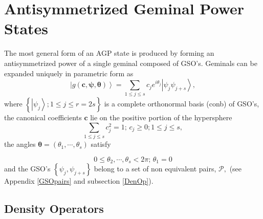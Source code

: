 \documentclass[aps,preprint]{revtex4}%
\begin{document}
\section{Antisymmetrized Geminal Power States\label{AGP States}}

The most general form of an AGP state is produced by forming an
antisymmetrized power of a single geminal composed of GSO's. Geminals can be
expanded uniquely in parametric form as
\begin{equation}
\left\vert g\left(  \boldsymbol{c},\boldsymbol{\psi},\boldsymbol{\theta
}\right)  \right\rangle =\sum_{1\leq j\leq s}c_{j}e^{i\theta_{j}}\left\vert
\psi_{j}\psi_{j+s}\right\rangle , \label{gem}%
\end{equation}
where $\left\{  \left\vert \psi_{j}\right\rangle ;1\leq j\leq r=2s\right\}  $
is a complete orthonormal basis (conb) of GSO's, the canonical coefficients
$\mathbf{c}$ lie on the positive portion of the hypersphere
\begin{equation}
\sum\limits_{1\leq j\leq s}c_{j}^{2}=1;\,c_{j}\geq0;1\leq j\leq s,
\end{equation}
the angles $\boldsymbol{\theta}=\left(  \theta_{1},\cdots,\theta_{s}\right)  $ satisfy%

\begin{equation}
0\leq\theta_{2},\cdots,\theta_{s}<2\pi;\,\theta_{1}=0 \label{Phases}%
\end{equation}
and the GSO's $\left\{  \psi_{j},\psi_{j+s}\right\}  $ belong to a set of non
equivalent pairs, $\mathcal{P},$ (see Appendix \ref{GSOpairs} and subsection
\ref{DenOp}).

\subsection{Density Operators\label{DenOp}}
\end{document}
